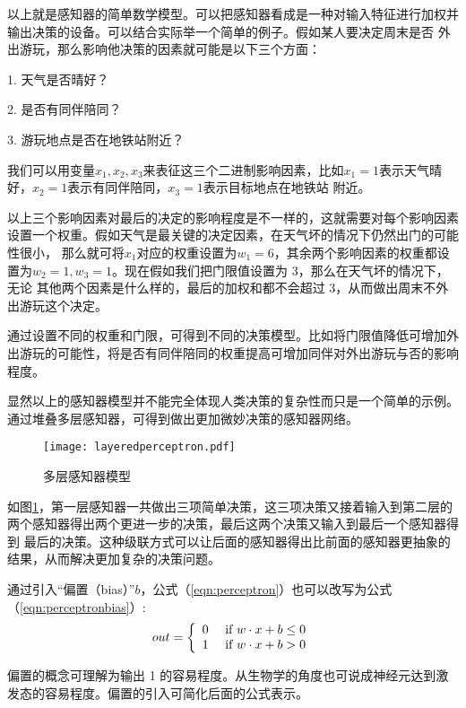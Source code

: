 以上就是感知器的简单数学模型。可以把感知器看成是一种对输入特征进行加权并输出决策的设备。可以结合实际举一个简单的例子。假如某人要决定周末是否
外出游玩，那么影响他决策的因素就可能是以下三个方面：

1. 天气是否晴好？

2. 是否有同伴陪同？

3. 游玩地点是否在地铁站附近？

我们可以用变量$x_1, x_2, x_3$来表征这三个二进制影响因素，比如$x_1 = 1$表示天气晴好，$x_2 = 1$表示有同伴陪同，$x_3 = 1$表示目标地点在地铁站
附近。

以上三个影响因素对最后的决定的影响程度是不一样的，这就需要对每个影响因素设置一个权重。假如天气是最关键的决定因素，在天气坏的情况下仍然出门的可能性很小，
那么就可将$x_1$对应的权重设置为$w_1=6$，其余两个影响因素的权重都设置为$w_2=1, w_3=1$。现在假如我们把门限值设置为 3，那么在天气坏的情况下，无论
其他两个因素是什么样的，最后的加权和都不会超过 3，从而做出周末不外出游玩这个决定。

通过设置不同的权重和门限，可得到不同的决策模型。比如将门限值降低可增加外出游玩的可能性，将是否有同伴陪同的权重提高可增加同伴对外出游玩与否的影响程度。

显然以上的感知器模型并不能完全体现人类决策的复杂性而只是一个简单的示例。通过堆叠多层感知器，可得到做出更加微妙决策的感知器网络。

\begin{figure}[h]
	\texttt{[image: layeredperceptron.pdf]}
	\caption{多层感知器模型}
	\label{layeredperceptron}
\end{figure}

如图\ref{layeredperceptron}，第一层感知器一共做出三项简单决策，这三项决策又接着输入到第二层的两个感知器得出两个更进一步的决策，最后这两个决策又输入到最后一个感知器得到
最后的决策。这种级联方式可以让后面的感知器得出比前面的感知器更抽象的结果，从而解决更加复杂的决策问题。

通过引入“偏置（bias）”$b$，公式（\ref{eqn:perceptron}）也可以改写为公式（\ref{eqn:perceptronbias}）:
\begin{equation}
	\label{eqn:perceptronbias}
out = \left\{ \begin{array} { l l } { 0 } & { \text { if } w \cdot x + b \leq 0 } \\ { 1 } & { \text { if } w \cdot x + b > 0 } \end{array} \right.
\end{equation}

偏置的概念可理解为输出 1 的容易程度。从生物学的角度也可说成神经元达到激发态的容易程度。偏置的引入可简化后面的公式表示。

